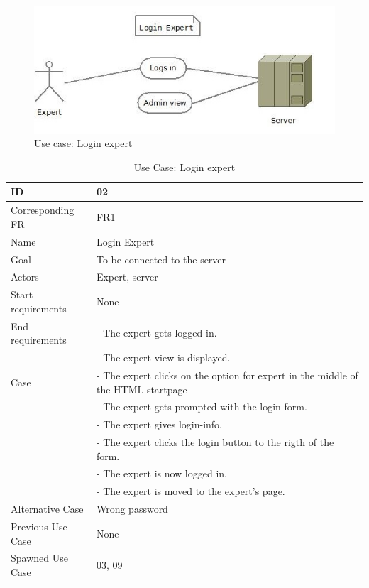 \begin{figure}[H]
  \centering
    \includegraphics[width=1.0\textwidth]{img/loginexpert.jpg}
  \caption{Use case: Login expert} 
  \label{fig:loginexpert}
\end{figure}


\begin{table}[H]
\begin{tabular}{|l|p{14cm}|} \hline
	\textbf{ID} & \textbf{02}\\ \hline
	Corresponding FR & FR1\\ \hline
	Name & Login Expert\\ \hline
	Goal & To be connected to the server\\ \hline
	Actors & Expert, server\\ \hline
	Start requirements & None\\ \hline
	End requirements & - The expert gets logged in.\\
					 & - The expert view is displayed.\\ \hline
	Case & - The expert clicks on the option for expert in the middle of the HTML startpage\\
			& - The expert gets prompted with the login form. \\
		 	& - The expert gives login-info.\\
			& - The expert clicks the login button to the rigth of the form.\\
			& - The expert is now logged in.\\ 
			& - The expert is moved to the expert's page. \\ \hline
	Alternative Case & Wrong password\\ \hline
	Previous Use Case & None\\ \hline
	Spawned Use Case & 03, 09\\ \hline
\end{tabular}
\caption{Use Case: Login expert}
\label{fig:usecase02table}
\end{table}


